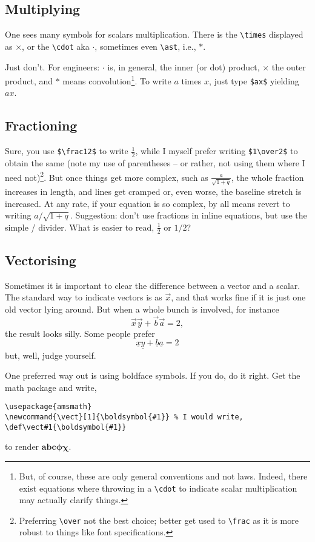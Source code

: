 \documentclass{article}
\begin{document}
\subsection{Multiplying}
One sees many symbols for scalars multiplication.  There is the \verb+\times+ displayed as $\times$, or the \verb+\cdot+ aka $\cdot$, sometimes even \verb+\ast+, i.e., $\ast$.

Just don't.  For engineers: $\cdot$ is, in general, the inner (or dot) product, $\times$ the  outer product, and $\ast$ means convolution\footnote{But, of course, these are only general conventions and not laws.  Indeed, there exist equations where throwing in a \verb+\cdot+ to indicate scalar multiplication may actually clarify things.}. To write $a$ times $x$, just type \verb+$ax$+ yielding $ax$.


\subsection{Fractioning}
Sure, you use \verb+$\frac12$+ to write $\frac12$, while I myself prefer writing \verb+$1\over2$+ to obtain the same (note my use of parentheses -- or rather, not using them where I need not)\footnote{Preferring \verb+\over+ not the best choice; better get used to \verb+\frac+ as it is more robust to things like font specifications.}.  But once things get more complex, such as $\frac a{\sqrt{1+q}}$, the whole fraction increases in length, and lines get cramped or, even worse, the baseline stretch is increased. At any rate, if your equation is so complex, by all means revert to writing $a/{\sqrt{1+q}}$.   Suggestion: don't use fractions in inline equations, but use the simple / divider.  What is easier to read, $\frac12$ or $1/2$?

\subsection{Vectorising}
Sometimes it is important to clear the difference between a vector and a scalar. The standard way to indicate vectors is as $\vec x$, and that works fine if it is  just one old vector lying around.  But when a whole bunch is involved, for instance $$ \vec x \vec y + \vec b \vec a = 2,$$ the result looks silly.  Some people prefer $$ \underline x \underline y + \underline b \underline a = 2$$ but, well, judge yourself.  

One preferred way out is using boldface symbols.  If you do, do it right.  Get the \AmS math package and write,
\begin{verbatim}
\usepackage{amsmath}
\newcommand{\vect}[1]{\boldsymbol{#1}} % I would write, \def\vect#1{\boldsymbol{#1}}
\end{verbatim}
to render $\boldsymbol{abc\phi\chi}$.
\end{document}
